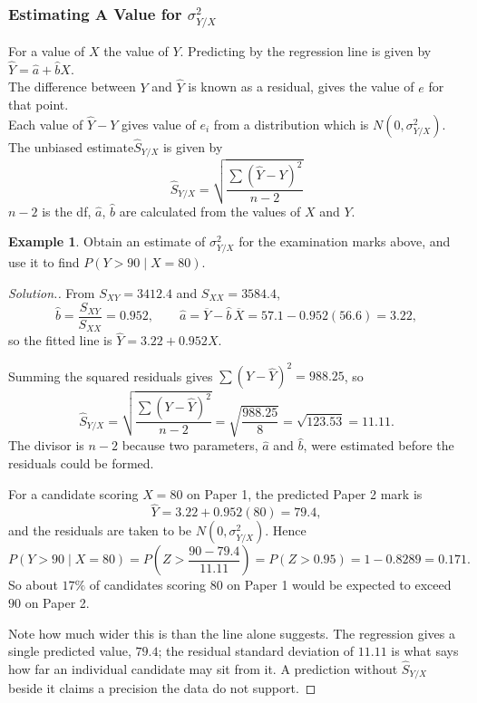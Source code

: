\documentclass[11pt,a4paper]{article}
\theoremstyle{definition}
\newtheorem{example}[thm]{Example}
\newenvironment{solution}
  {\renewcommand{\qedsymbol}{}\begin{proof}[\textit{Solution}.]}
  {\end{proof}}
\begin{document}
\subsubsection{Estimating A Value for $\sigma^2_{Y/X}$}
For a value of $X$ the value of $Y$. Predicting by the regression line is given by $\hat{Y}=\hat{a}+\hat{b}X$.\\

The difference between $Y$ and $\hat{Y}$ is known as a residual, gives the value of $e$ for that point.\\ Each value of $\hat{Y}-Y$ gives value of $e_i$ from a distribution which is $N(0,\sigma^2_{Y/X})$. The unbiased estimate$\hat{S}_{Y/X}$ is given by \[\hat{S}_{Y/X}=\sqrt{\frac{\sum (\hat{Y}-Y)^2}{n-2}}\] $n-2$ is the df, $\hat{a}$, $\hat{b}$ are calculated from the values of $X$ and $Y$.\\


\begin{example}
Obtain an estimate of $\sigma^2_{Y/X}$ for the examination marks above, and use it to find
$P(Y>90 \mid X=80)$.
\end{example}

\begin{solution}
From $S_{XY}=3412.4$ and $S_{XX}=3584.4$,
\[\hat{b}=\frac{S_{XY}}{S_{XX}}=0.952,\qquad
\hat{a}=\overline{Y}-\hat{b}\,\overline{X}=57.1-0.952(56.6)=3.22,\]
so the fitted line is $\hat{Y}=3.22+0.952X$.

Summing the squared residuals gives $\sum(Y-\hat{Y})^2=988.25$, so
\[\hat{S}_{Y/X}=\sqrt{\frac{\sum (Y-\hat{Y})^2}{n-2}}=\sqrt{\frac{988.25}{8}}
=\sqrt{123.53}=11.11.\]
The divisor is $n-2$ because two parameters, $\hat{a}$ and $\hat{b}$, were
estimated before the residuals could be formed.

For a candidate scoring $X=80$ on Paper 1, the predicted Paper 2 mark is
\[\hat{Y}=3.22+0.952(80)=79.4,\]
and the residuals are taken to be $N(0,\sigma^2_{Y/X})$. Hence
\[P(Y>90 \mid X=80)=P\left(Z>\frac{90-79.4}{11.11}\right)=P(Z>0.95)=1-0.8289=0.171.\]
So about $17\%$ of candidates scoring $80$ on Paper 1 would be expected to exceed $90$ on
Paper 2.

Note how much wider this is than the line alone suggests. The regression gives a single
predicted value, $79.4$; the residual standard deviation of $11.11$ is what says how far an
individual candidate may sit from it. A prediction without $\hat{S}_{Y/X}$ beside it
claims a precision the data do not support.
\end{solution}
\end{document}
